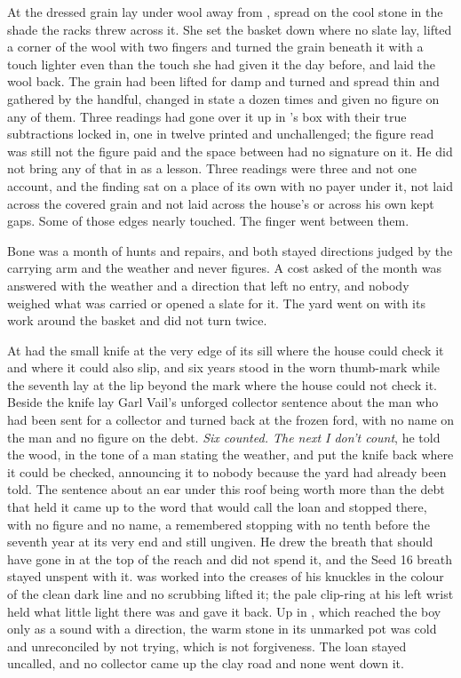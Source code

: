 At  the dressed grain lay under wool away from , spread on the cool stone in the shade the racks threw across it. She set the basket down where no slate lay, lifted a corner of the wool with two fingers and turned the grain beneath it with a touch lighter even than the touch she had given it the day before, and laid the wool back. The grain had been lifted for damp and turned and spread thin and gathered by the handful, changed in state a dozen times and given no figure on any of them. Three readings had gone over it up  in 's box with their true subtractions locked in, one in twelve printed and unchallenged; the figure read was still not the figure paid and the space between had no signature on it. He did not bring any of that in as a lesson. Three readings were three and not one account, and the finding sat on a place of its own with no payer under it, not laid across the covered grain and not laid across the house's  or across his own kept gaps. Some of those edges nearly touched. The finger went between them.

Bone was a month of hunts and repairs, and both stayed directions judged by the carrying arm and the weather and never figures. A cost asked of the month was answered with the weather and a direction that left no entry, and nobody weighed what was carried or opened a slate for it. The yard went on with its work around the basket and did not turn twice.

\scenebreak

At   had the small knife at the very edge of its sill where the house could check it and where it could also slip, and six years stood in the worn thumb-mark while the seventh lay at the lip beyond the mark where the house could not check it. Beside the knife lay Garl Vail's unforged collector sentence about the man who had been sent for a collector and turned back at the frozen ford, with no name on the man and no figure on the debt. \emph{Six counted. The next I don't count}, he told the wood, in the tone of a man stating the weather, and put the knife back where it could be checked, announcing it to nobody because the yard had already been told. The sentence about an ear under this roof being worth more than the debt that held it came up to the word that would call the loan and stopped there, with no figure and no name, a remembered stopping with no tenth before the seventh year at its very end and still ungiven. He drew the breath that should have gone in at the top of the reach and did not spend it, and the Seed 16 breath stayed unspent with it.  was worked into the creases of his knuckles in the colour of the clean dark line and no scrubbing lifted it; the pale clip-ring at his left wrist held what little light there was and gave it back. Up in , which reached the boy only as a sound with a direction, the warm stone in its unmarked pot was cold and unreconciled by not trying, which is not forgiveness. The loan stayed uncalled, and no collector came up the clay road and none went down it.

